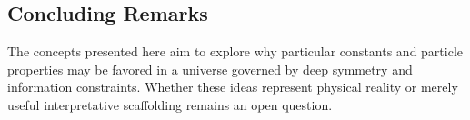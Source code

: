\subsection*{Concluding Remarks}

The concepts presented here aim to explore why particular constants and particle
properties may be favored in a universe governed by deep symmetry and information
constraints. Whether these ideas represent physical reality or merely useful
interpretative scaffolding remains an open question.

